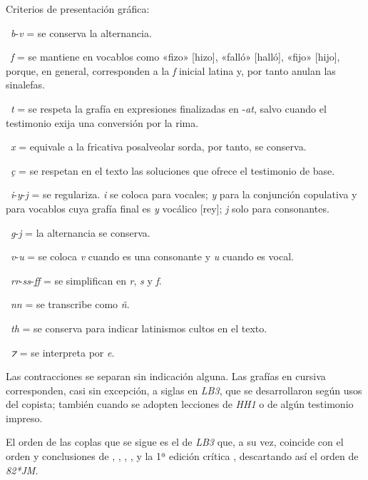 \documentclass[11pt,a4paper,twoside]{article}
\newcommand{\comillas}[1]{«#1»}
\begin{document}
Criterios de presentación gráfica:

~\textit{b}-\textit{v} = se conserva la alternancia.

~\textit{f} = se mantiene en vocablos como \comillas{fizo} [hizo], \comillas{falló} [halló], \comillas{fijo} [hijo], porque, en general, corresponden a la \textit{f} inicial latina y, por tanto anulan las sinalefas.

~\textit{t} = se respeta la grafía en expresiones finalizadas en -\textit{at}, salvo cuando el testimonio exija una conversión por la rima.

~\textit{x} = equivale a la fricativa posalveolar sorda, por tanto, se conserva.

~\textit{ç} = se respetan en el texto las soluciones que ofrece el testimonio de base.

~\textit{i}-\textit{y}-\textit{j} = se regulariza. \textit{i} se coloca para vocales; \textit{y} para la conjunción copulativa y para vocablos cuya grafía final es \textit{y} vocálico [rey]; \textit{j} solo para consonantes.

~\textit{g}-\textit{j} = la alternancia se conserva.

~\textit{v}-\textit{u} = se coloca \textit{v} cuando es una consonante y \textit{u} cuando es vocal.

~\textit{rr}-\textit{ss}-\textit{ff} = se simplifican en \textit{r}, \textit{s} y \textit{f}.

~\textit{nn} = se transcribe como \textit{ñ}.

~\textit{th} = se conserva para indicar latinismos cultos en el texto.

~\textit{⁊} = se interpreta por \textit{e}.

Las contracciones se separan sin indicación alguna. Las grafías en cursiva corresponden, casi sin excepción, a siglas en \textit{LB3}, que se desarrollaron según usos del copista; también cuando se adopten lecciones de \textit{HH1} o de algún testimonio impreso.

El orden de las coplas que se sigue es el de \textit{LB3} que, a su vez, coincide con el orden y conclusiones de \textcite{Senabre1983}, \textcite{Palumbo1983}, \textcite{Orduna1967}, \textcite{Beltrán1991,Beltrán2013}, \textcite{PérezPriego1990,PérezPriego2017} y la 1ª edición crítica \parencite{Foulché-Delbosc1902}, descartando así el orden de \textit{82*JM}.
\end{document}
